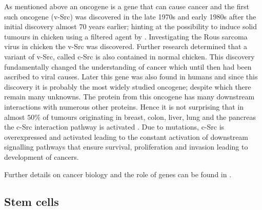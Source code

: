 As mentioned above an oncogene is a gene that can cause cancer and the first such oncogene (v-Src) was discovered in the late 1970s and early 1980s \cite{Martin:2001jx} after the initial discovery almost 70 years earlier; hinting at the possibility to induce solid tumours in chicken using a filtered agent by \cite{Rous:1911uf}. Investigating the Rous sarcoma virus in chicken the v-Src was discovered. Further research determined that a variant of v-Src, called c-Src is also contained in normal chicken. This discovery  fundamentally changed the understanding of cancer which until then had been ascribed to  viral causes. Later this gene was also found in humans and since this discovery it is probably the most widely studied oncogene; despite which there remain many unknowns. The protein from this oncogene has many downstream interactions with numerous other proteins. Hence it is not surprising that in almost $50\%$ of tumours originating in breast, colon, liver, lung and the pancreas the c-Src interaction pathway is activated \cite{Dehm:2013fr}. Due to mutations, c-Src is overexpressed and activated leading to the constant activation of downstream signalling pathways that ensure survival, proliferation and invasion leading to development of cancers.

Further details on cancer biology and the role of genes can be found in \cite{Weinberg:2013uu}. 

\subsection{Stem cells}
\label{sec:stem-cells}

